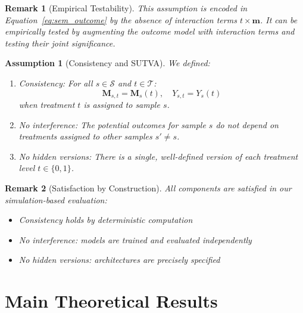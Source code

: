 \documentclass[
    reprint,
    amsmath, amssymb,
    aps,
    floatfix,
    nofootinbib
]{revtex4-1}
\newtheorem{assumption}{Assumption}
\newtheorem{remark}{Remark}
\begin{document}
\begin{remark}[Empirical Testability]
This assumption is encoded in Equation~\eqref{eq:sem_outcome} by the absence of interaction terms $t \times \bm{m}$. It can be empirically tested by augmenting the outcome model with interaction terms and testing their joint significance.
\end{remark}

\begin{assumption}[Consistency and SUTVA]\label{assum:consistency}
We defined: 

\begin{enumerate}
    \item Consistency: For all $s \in \mathcal{S}$ and $t \in \mathcal{T}$:
    \begin{equation}
        \bm{M}_{s,t} = \bm{M}_s(t), \quad Y_{s,t} = Y_s(t)
    \end{equation}
    when treatment $t$ is assigned to sample $s$.
    
    \item No interference: The potential outcomes for sample $s$ do not depend on treatments assigned to other samples $s' \neq s$.
    
    \item No hidden versions: There is a single, well-defined version of each treatment level $t \in \{0,1\}$.
\end{enumerate}
\end{assumption}

\begin{remark}[Satisfaction by Construction]
All components are satisfied in our simulation-based evaluation:
\begin{itemize}
    \item Consistency holds by deterministic computation
    \item No interference: models are trained and evaluated independently
    \item No hidden versions: architectures are precisely specified
\end{itemize}
\end{remark}

\section{Main Theoretical Results}
\end{document}
